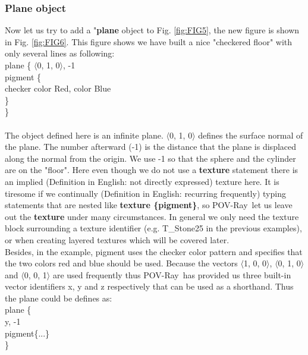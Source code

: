 \documentclass[fleqn,10pt]{wlscirep}
\newcommand*{\PV}{POV-Ray}
\newcommand*{\DF}{Definition in English}
\begin{document}
\subsubsection{Plane object}
Now let us try to add a "\textbf{plane} object to Fig. \ref{fig:FIG5}, the new figure is shown in Fig. \ref{fig:FIG6}. This figure shows we have built a nice "checkered floor" with only several lines as following:\\
\textcolor[rgb]{0.2,0.1,1}
{
plane \{ $\langle$0, 1, 0$\rangle$, -1\\
pigment \{  \\
checker color Red, color Blue  \\
\}  \\
\}  \\
} \\
\newline
The object defined here is an infinite plane. $\langle$0, 1, 0$\rangle$ defines the surface normal of the plane. The number afterward (-1) is the distance that the plane is displaced along the normal from the origin. We use -1 so that the sphere and the cylinder are on the "floor". Here even though we do not use a \textbf{texture} statement there is an implied (\DF: not directly expressed) texture here. It is tiresome if we continually (\DF: recurring frequently) typing statements that are nested like \textbf{texture \{pigment\}}, so \PV~let us leave out the \textbf{texture} under many circumstances. In general we only need the texture block surrounding a texture identifier (e.g. T\_Stone25 in the previous examples), or when creating layered textures which will be covered later. \\
\newline
Besides, in the example, pigment uses the checker color pattern and specifies that the two colors red and blue should be used. Because the vectors $\langle$1, 0, 0$\rangle$, $\langle$0, 1, 0$\rangle$ and $\langle$0, 0, 1$\rangle$ are used frequently thus \PV~has provided us three built-in vector identifiers x, y and z respectively that can be used as a shorthand. Thus the plane could be defines as:\\
\textcolor[rgb]{0.2,0.1,1}
{
plane \{ \\
y, -1  \\
pigment\{...\}  \\
\}  \\
}
\end{document}
